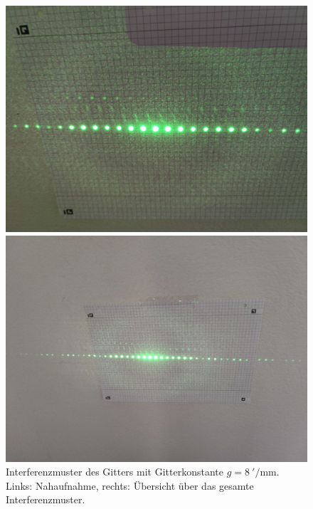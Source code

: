 \documentclass[ngerman]{scrartcl}
\begin{document}
\begin{figure}[H]
    \centering
    \begin{minipage}[t]{0.45\linewidth}
        \centering
        \includegraphics[width=\linewidth]{fig/Compressed/Gitter_8_per_mm.jpg}
    \end{minipage}%
    \hspace*{\fill}
    \begin{minipage}[t]{0.45\linewidth}
        \centering
        \includegraphics[width=\linewidth]{fig/Compressed/Gitter_8_per_mm_overview.jpg}
    \end{minipage}
    \caption[Interferenzmuster des Gitters]{Interferenzmuster des Gitters mit Gitterkonstante $g=\SI{8}{'\per\milli\meter}$. Links: Nahaufnahme, rechts: Übersicht über das gesamte Interferenzmuster.}
    \label{fig:gitter_interferenzmuster}
\end{figure}
\end{document}
